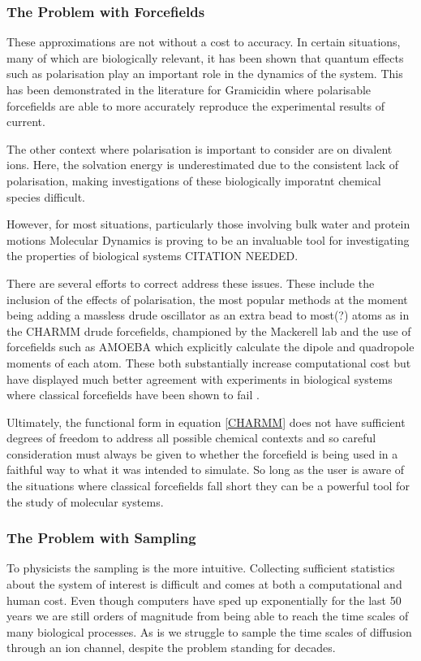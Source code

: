 \subsubsection{The Problem with Forcefields}
These approximations are not without a cost to accuracy. In certain situations, many of which are biologically relevant, it has been shown that quantum effects such as polarisation play an important role in the dynamics of the system. This has been demonstrated in the literature for Gramicidin where polarisable forcefields are able to more accurately reproduce the experimental results of current.

The other context where polarisation is important to consider are on divalent ions. Here, the solvation energy is underestimated due to the consistent lack of polarisation, making investigations of these biologically imporatnt chemical species difficult.

However, for most situations, particularly those involving bulk water and protein motions Molecular Dynamics is proving to be an invaluable tool for investigating the properties of biological systems CITATION NEEDED.  

There are several efforts to correct address these issues. These include the inclusion of the effects of polarisation, the most popular methods at the moment being adding a massless drude oscillator as an extra bead to most(?) atoms as in the CHARMM drude forcefields, championed by the Mackerell lab and the use of forcefields such as AMOEBA which explicitly calculate the dipole and quadropole moments of each atom. These both substantially increase computational cost but have displayed much better agreement with experiments in biological systems where classical forcefields have been shown to fail \cite{ngo2021}. 

Ultimately, the functional form in equation \ref{CHARMM} does not have sufficient degrees of freedom to address all possible chemical contexts  and so careful consideration must always be given to whether the forcefield is being used in a faithful way to what it was intended to simulate. So long as the user is aware of the situations where classical forcefields fall short they can be a powerful tool for the study of molecular systems.

\subsubsection{The Problem with Sampling}

To physicists the sampling is the more intuitive. Collecting sufficient statistics about the system of interest is difficult and comes at both a computational and human cost. Even though computers have sped up exponentially for the last 50 years we are still orders of magnitude from being able to reach the time scales of many biological processes. As is we struggle to sample the time scales of diffusion through an ion channel, despite the problem standing for decades. 

